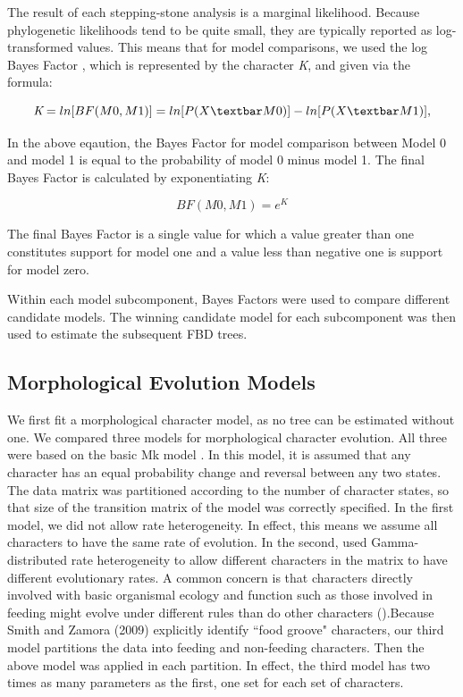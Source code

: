 \documentclass{article}
\begin{document}
The result of each stepping-stone analysis is a marginal likelihood.
Because phylogenetic likelihoods tend to be quite small, they are typically reported as log-transformed values.
This means that for model comparisons, we used the log Bayes Factor \citep{Kass1995}, which is represented by the character \textit{K}, and given via the formula:

\begin{center}
  \[  \textit{K}=ln[BF(M0,M1)]=ln[P(X \textbar M0)] - ln[P(X \textbar M1)],  \]
\end{center}    
    
In the above eqaution, the Bayes Factor for model comparison between Model 0 and model 1 is equal to the probability of model 0 minus model 1. The final Bayes Factor is calculated by exponentiating \textit{K}:

\begin{center}
  \[  BF(M0,M1)=\textit{e}^\textit{K} \]
\end{center}

The final Bayes Factor is a single value for which a value greater than one constitutes support for model one and a value less than negative one is support for model zero. 

 Within each model subcomponent, Bayes Factors were used to compare different candidate models. 
The winning candidate model for each subcomponent was then used to estimate the subsequent FBD trees.

\subsection{Morphological Evolution Models}
We first fit a morphological character model, as no tree can be estimated without one.
We compared three models for morphological character evolution. 
All three were based on the basic Mk model \citep{Lewis2001}. 
In this model, it is assumed that any character has an equal probability change and reversal between any two states. 
The data matrix was partitioned according to the number of character states, so that size of the transition matrix of the model was correctly specified.
In the first model, we did not allow rate heterogeneity. 
In effect, this means we assume all characters to have the same rate of evolution.
In the second, used Gamma-distributed rate heterogeneity to allow different characters in the matrix to have different evolutionary rates.
A common concern is that characters directly involved with basic organismal ecology and function such as those involved in feeding might evolve under different rules than do other characters (\citep{Foote1994,Foote1996a,Wagner1995,Sánchez-Villagra1998,Ciampaglio2002}).Because Smith and Zamora (2009) explicitly identify ``food groove" characters, our third model partitions the data into feeding and non-feeding characters.
Then the above model was applied in each partition.
In effect, the third model has two times as many parameters as the first, one set for each set of characters.
\end{document}
